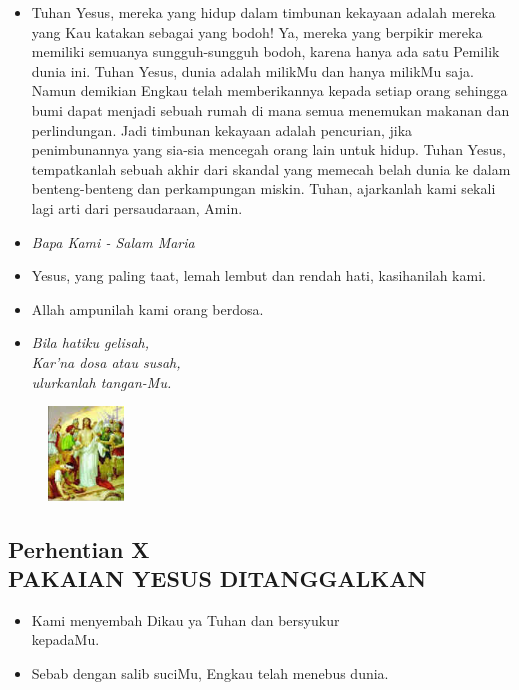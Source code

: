 \documentclass[a5paper,headsepline,titlepage,10pt,nnormalheadings,DIVcalc]{scrbook}
\newcommand{\BU}[1]{\begin{itemize} \item[U:] #1 \end{itemize}}
\newcommand{\BP}[1]{\begin{itemize} \item[P:] #1 \end{itemize}}
\newcommand{\kamiMenyembah}{\BP{ Kami menyembah Dikau ya Tuhan dan bersyukur\\kepadaMu.}
\BU{ Sebab dengan salib suciMu, Engkau telah menebus dunia.}
}
\newcommand{\kasihanilahKami}{\BP{Yesus, yang paling taat, lemah lembut dan rendah hati, kasihanilah kami.}
\BU{Allah ampunilah kami orang berdosa.}}
\begin{document}
\BU{Tuhan Yesus, mereka yang hidup dalam timbunan kekayaan adalah mereka yang Kau katakan sebagai yang bodoh!
Ya, mereka yang berpikir mereka memiliki semuanya sungguh-sungguh bodoh, karena hanya ada satu Pemilik dunia ini. Tuhan Yesus, dunia adalah milikMu dan hanya milikMu saja. Namun demikian Engkau telah memberikannya kepada setiap orang sehingga bumi dapat menjadi sebuah rumah di mana semua menemukan makanan dan perlindungan. Jadi timbunan kekayaan adalah pencurian, jika penimbunannya yang sia-sia mencegah orang lain untuk hidup. Tuhan Yesus, tempatkanlah sebuah akhir dari skandal yang memecah belah dunia ke dalam benteng-benteng dan perkampungan miskin. Tuhan, ajarkanlah kami sekali lagi arti dari persaudaraan, Amin. }

\large\begin{itemize}\item[~]\it{Bapa Kami - Salam Maria}\end{itemize}\normalsize
\kasihanilahKami

\begin{itemize}
\item[10.] \it{Bila hatiku gelisah,\\
	Kar’na dosa atau susah,\\
	ulurkanlah tangan-Mu.}
\end{itemize}

\begin{figure}
\includegraphics[width=2cm]{jalansalib_files/10_small.jpg}
\end{figure}
\subsection*{Perhentian X\\
PAKAIAN YESUS DITANGGALKAN}

\kamiMenyembah
\end{document}
